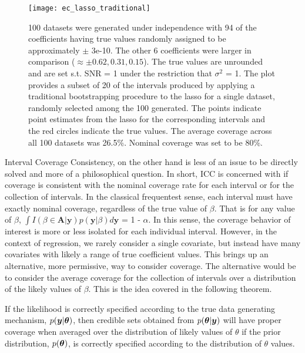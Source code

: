 \begin{figure}[hbtp]
  \begin{center}
    \texttt{[image: ec\_lasso\_traditional]}
    \caption{\label{Fig:traditional} 100 datasets were generated under independence with 94 of the coefficients having true values randomly assigned to be approximately $\pm$ 3e-10. The other 6 coefficients were larger in comparison ($\approx \pm 0.62, 0.31, 0.15$). The true values are unrounded and are set s.t. SNR = 1 under the restriction that $\sigma^2$ = 1. The plot provides a subset of 20 of the intervals produced by applying a traditional bootstrapping procedure to the lasso for a single dataset, randomly selected among the 100 generated. The points indicate point estimates from the lasso for the corresponding intervals and the red circles indicate the true values. The average coverage across all 100 datasets was 26.5\%. Nominal coverage was set to be 80\%.}
  \end{center}
  \end{figure}

Interval Coverage Consistency, on the other hand is less of an issue to be directly solved and more of a philosophical question. In short, ICC is concerned with if coverage is consistent with the nominal coverage rate for each interval or for the collection of intervals. In the classical frequentest sense, each interval must have exactly nominal coverage, regardless of the true value of $\beta$. That is for any value of $\beta$, $\int I(\beta \in \boldsymbol{A} | \boldsymbol{y}) p(\boldsymbol{y} | \beta)d\boldsymbol{y}$ = 1 - $\alpha$. In this sense, the coverage behavior of interest is more or less isolated for each individual interval. However, in the context of regression, we rarely consider a single covariate, but instead have many covariates with likely a range of true coefficient values. This brings up an alternative, more permissive, way to consider coverage. The alternative would be to consider the average coverage for the collection of intervals over a distribution of the likely values of $\beta$. This is the idea covered in the following theorem.

\begin{thm}
  \label{Thm:bcc}
  If the likelihood is correctly specified according to the true data generating mechanism, $p(\boldsymbol{y} | \boldsymbol{\theta})$, then credible sets obtained from $p(\boldsymbol{\theta}|\boldsymbol{y})$ will have proper coverage when averaged over the distribution of likely values of $\theta$ if the prior distribution, $p(\boldsymbol{\theta})$, is correctly specified according to the distribution of $\theta$ values.
\end{thm}

